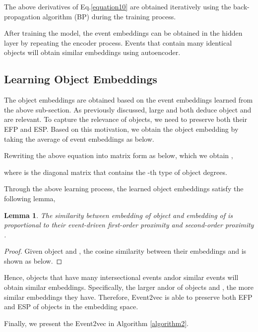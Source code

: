 \smallskip

The above derivatives of Eq.\ref{equation10} are obtained iteratively using the back-propagation algorithm (BP) \cite{lecun2015deep} during the training process.
\smallskip

After training the model, the event embeddings can be obtained in the hidden layer by repeating the encoder process. Events that contain many identical objects will obtain similar embeddings using autoencoder.


\subsection{Learning Object Embeddings}
The object embeddings are obtained based on the event embeddings learned from the above sub-section. As previously discussed, large  and  both deduce object  and  are relevant. To capture the relevance of objects, we need to preserve both their EFP and ESP. Based on this motivation, we obtain the object embedding  by taking the average of event embeddings  as below.



\noindent Rewriting the above equation into matrix form as below, which we obtain ,



\noindent where  is the diagonal matrix that contains the -th type of object degrees.
\smallskip

Through the above learning process, the learned object embeddings satisfy the following lemma,
\newtheorem{myprop}{Lemma}
\begin{myprop}
	The similarity between embedding  of object  and embedding  of  is proportional to their event-driven first-order proximity  and second-order proximity .
\end{myprop}
\begin{proof}
	Given object  and , the cosine similarity between their embeddings  and  is shown as below.
	
\end{proof}
Hence, objects that have many intersectional events andor similar events will obtain similar embeddings. Specifically, the larger  andor  of objects  and , the more similar embeddings they have. Therefore, Event2vec is able to preserve both EFP and ESP of objects in the embedding space.
\smallskip

Finally, we present the Event2vec in Algorithm \ref{algorithm2}.

